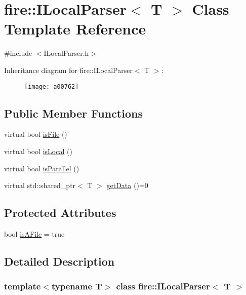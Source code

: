 \hypertarget{a00762}{}\section{fire\+:\+:I\+Local\+Parser$<$ T $>$ Class Template Reference}
\label{a00762}


{\ttfamily \#include $<$I\+Local\+Parser.\+h$>$}

Inheritance diagram for fire\+:\+:I\+Local\+Parser$<$ T $>$\+:\begin{figure}[H]
\begin{center}
\leavevmode
\texttt{[image: a00762]}
\end{center}
\end{figure}
\subsection*{Public Member Functions}
\begin{DoxyCompactItemize}
\item 
virtual bool \hyperlink{a00762_a091d5cf56bf8f407854ef87f460b2958}{is\+File} ()
\item 
virtual bool \hyperlink{a00762_a770acae6e216de3a9c7140a12de25d58}{is\+Local} ()
\item 
virtual bool \hyperlink{a00762_ad46898c516adcce38acbb4800dc9777b}{is\+Parallel} ()
\item 
virtual std\+::shared\+\_\+ptr$<$ T $>$ \hyperlink{a00762_a0fc1446d106f0ab8daf8744a4bd29a65}{get\+Data} ()=0
\end{DoxyCompactItemize}
\subsection*{Protected Attributes}
\begin{DoxyCompactItemize}
\item 
bool \hyperlink{a00762_a39adf288ae0bc79cf39fd6e4638858cf}{is\+A\+File} = true
\end{DoxyCompactItemize}


\subsection{Detailed Description}
\subsubsection*{template$<$typename T$>$\newline
class fire\+::\+I\+Local\+Parser$<$ T $>$}

